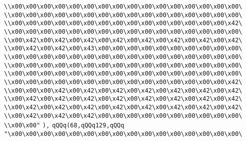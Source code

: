 \verb|\\x00\x00\x00\x00\x00\x00\x00\x00\x00\x00\x00\x00\x00\x00\x00\x00\|\newline
\verb|\\x00\x00\x00\x00\x00\x00\x00\x00\x00\x00\x00\x00\x00\x00\x00\x00\|\newline
\verb|\\x00\x00\x00\x00\x00\x00\x00\x00\x00\x00\x00\x00\x00\x00\x00\x42\|\newline
\verb|\\x00\x00\x00\x00\x00\x00\x00\x00\x00\x00\x00\x00\x00\x00\x00\x00\|\newline
\verb|\\x00\x42\x00\x42\x00\x42\x00\x42\x00\x42\x00\x42\x00\x42\x00\x42\|\newline
\verb|\\x00\x42\x00\x42\x00\x43\x00\x00\x00\x00\x00\x00\x00\x00\x00\x00\|\newline
\verb|\\x00\x00\x00\x00\x00\x00\x00\x00\x00\x00\x00\x00\x00\x00\x00\x00\|\newline
\verb|\\x00\x00\x00\x00\x00\x00\x00\x00\x00\x00\x00\x00\x00\x00\x00\x00\|\newline
\verb|\\x00\x00\x00\x00\x00\x00\x00\x00\x00\x00\x00\x00\x00\x00\x00\x00\|\newline
\verb|\\x00\x00\x00\x00\x00\x00\x00\x00\x00\x00\x00\x00\x00\x00\x00\x42\|\newline
\verb|\\x00\x00\x00\x42\x00\x42\x00\x42\x00\x42\x00\x42\x00\x42\x00\x42\|\newline
\verb|\\x00\x42\x00\x42\x00\x42\x00\x42\x00\x42\x00\x42\x00\x42\x00\x42\|\newline
\verb|\\x00\x42\x00\x42\x00\x42\x00\x42\x00\x42\x00\x42\x00\x42\x00\x42\|\newline
\verb|\\x00\x42\x00\x42\x00\x42\x00\x00\x00\x00\x00\x00\x00\x00\x00\x00\|\newline
\verb|\\x00\x00"|\newline
\verb|),|\newline
\verb|qQQq(68,qQQq129,qQQq|\newline
\verb|"\x00\x00\x00\x00\x00\x00\x00\x00\x00\x00\x00\x00\x00\x00\x00\x00\|\newline
